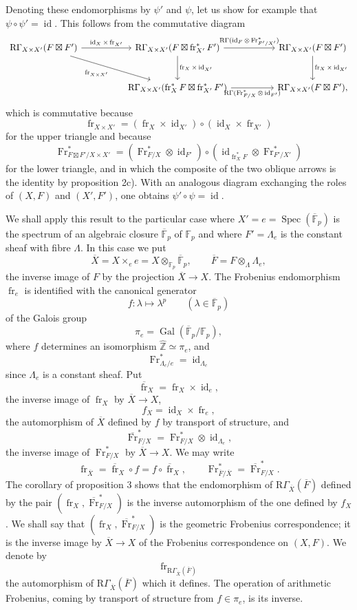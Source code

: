 \documentclass[11pt]{article}
\DeclareMathOperator{\Spec}{Spec}
\providecommand{\Gal}{\operatorname{Gal}}
\providecommand{\RGamma}{\mathrm R\Gamma}
\providecommand{\id}{\operatorname{id}}
\providecommand{\id}{\operatorname{id}}
\providecommand{\id}{\operatorname{id}}
\providecommand{\RGamma}{\mathrm R\Gamma}
\providecommand{\id}{\operatorname{id}}
\providecommand{\Spec}{\operatorname{Spec}}
\providecommand{\Spec}{\operatorname{Spec}}
\providecommand{\id}{\operatorname{id}}
\providecommand{\Spec}{\operatorname{Spec}}
\providecommand{\fr}{\operatorname{fr}}
\providecommand{\Fr}{\operatorname{Fr}}
\providecommand{\Fr}{\operatorname{Fr}}
\providecommand{\fr}{\operatorname{fr}}
\providecommand{\Spec}{\operatorname{Spec}}
\providecommand{\id}{\operatorname{id}}
\providecommand{\RGamma}{\mathrm R\Gamma}
\providecommand{\Gal}{\operatorname{Gal}}
\providecommand{\boxt}{\boxtimes}
\begin{document}
Denoting these endomorphisms by $\psi'$ and $\psi$, let us show for example that $\psi\circ\psi'=\id$. This follows from the commutative diagram
\[
\begin{tikzcd}[column sep=huge,row sep=large]
\RGamma_{X\times X'}(F\boxt F')
  \arrow[r,"\id_X\times\fr_{X'}"] \arrow[dr,"\fr_{X\times X'}"']
& \RGamma_{X\times X'}(F\boxt\fr_{X'}^*F')
  \arrow[r,"\RGamma(\id_F\otimes\Fr^*_{F'/X'})"] \arrow[d,"\fr_X\times\id_{X'}"]
& \RGamma_{X\times X'}(F\boxt F') \arrow[d,"\fr_X\times\id_{X'}"]\\
& \RGamma_{X\times X'}(\fr_X^*F\boxt\fr_{X'}^*F')
  \arrow[r,"\RGamma(\Fr^*_{F/X}\otimes\id_{F'})"']
& \RGamma_{X\times X'}(F\boxt F') ,
\end{tikzcd}
\]
which is commutative because
\[
\fr_{X\times X'}=(\fr_X\times\id_{X'})\circ(\id_X\times\fr_{X'})
\]
for the upper triangle and because
\[
\Fr^*_{F\boxt F'/X\times X'}=(\Fr^*_{F/X}\otimes\id_{F'})\circ(\id_{\fr_X^*F}\otimes\Fr^*_{F'/X'})
\]
for the lower triangle, and in which the composite of the two oblique arrows is the identity by proposition 2c). With an analogous diagram exchanging the roles of $(X,F)$ and $(X',F')$, one obtains $\psi'\circ\psi=\id$.

We shall apply this result to the particular case where $X'=e=\Spec(\overline{\mathbb F}_p)$ is the spectrum of an algebraic closure $\overline{\mathbb F}_p$ of $\mathbb F_p$ and where $F'=\Lambda_e$ is the constant sheaf with fibre $\Lambda$. In this case we put
\[
\overline X=X\times_e e=X\otimes_{\mathbb F_p}\overline{\mathbb F}_p,
\qquad
\overline F=F\otimes_\Lambda\Lambda_e,
\]
the inverse image of $F$ by the projection $\overline X\to X$. The Frobenius endomorphism $\fr_e$ is identified with the canonical generator
\[
f:\lambda\longmapsto\lambda^p\qquad(\lambda\in\overline{\mathbb F}_p)
\]
of the Galois group
\[
\pi_e=\Gal(\overline{\mathbb F}_p/\mathbb F_p),
\]
where $f$ determines an isomorphism $\widehat{\mathbb Z}\simeq\pi_e$, and
\[
\Fr^*_{\Lambda_e/e}=\id_{\Lambda_e}
\]
since $\Lambda_e$ is a constant sheaf. Put
\[
\overline{\fr}_X=\fr_X\times\id_e,
\]
the inverse image of $\fr_X$ by $\overline X\to X$,
\[
f_X=\id_X\times\fr_e,
\]
the automorphism of $\overline X$ defined by $f$ by transport of structure, and
\[
\overline{\Fr}^*_{F/X}=\Fr^*_{F/X}\otimes\id_{\Lambda_e},
\]
the inverse image of $\Fr^*_{F/X}$ by $\overline X\to X$. We may write
\[
\fr_{\overline X}=\overline{\fr}_X\circ f=f\circ\overline{\fr}_X,
\qquad
\Fr^*_{\overline F/\overline X}=\overline{\Fr}^*_{F/X}.
\]
The corollary of proposition 3 shows that the endomorphism of $\RGamma_{\overline X}(\overline F)$ defined by the pair $(\fr_X,\overline{\Fr}^*_{F/X})$ is the inverse automorphism of the one defined by $f_X$. We shall say that $(\fr_X,\overline{\Fr}^*_{F/X})$ is the geometric Frobenius correspondence; it is the inverse image by $\overline X\to X$ of the Frobenius correspondence on $(X,F)$. We denote by
\[
\fr_{\RGamma_{\overline X}(\overline F)}
\]
the automorphism of $\RGamma_{\overline X}(\overline F)$ which it defines. The operation of arithmetic Frobenius, coming by transport of structure from $f\in\pi_e$, is its inverse.
\end{document}
